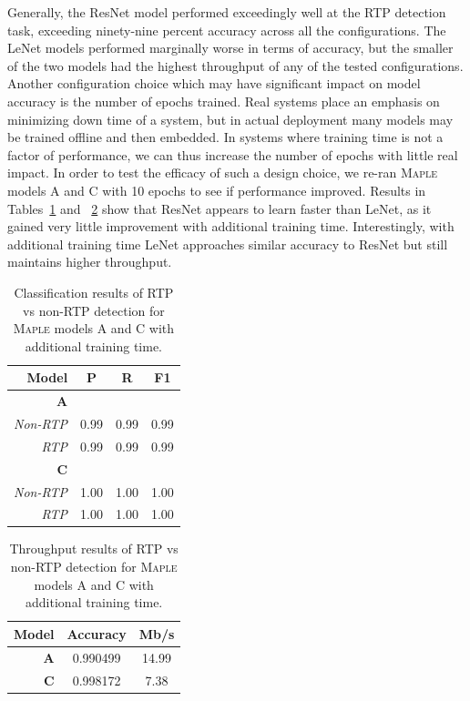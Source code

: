 Generally, the ResNet model performed exceedingly well at the RTP detection task, exceeding ninety-nine percent accuracy across all the configurations. The LeNet models performed marginally worse in terms of accuracy, but the smaller of the two models had the highest throughput of any of the tested configurations. Another configuration choice which may have significant impact on model accuracy is the number of epochs trained. Real systems place an emphasis on minimizing down time of a system, but in actual deployment many models may be trained offline and then embedded. In systems where training time is not a factor of performance, we can thus increase the number of epochs with little real impact. In order to test the efficacy of such a design choice, we re-ran \textsc{Maple} models A and C with 10 epochs to see if performance improved. Results in Tables~\ref{tab:addepoch1} and ~\ref{tab:addepoch2} show that ResNet appears to learn faster than LeNet, as it gained very little improvement with additional training time. Interestingly, with additional training time LeNet approaches similar accuracy to ResNet but still maintains higher throughput.

\begin{table} [h!]
\centering
\small
\begin{tabular}{| r | c | c | c |}
\hline
Model & P & R & F1 \\
\hline
\textbf{A} &&& \\
\textit{Non-RTP} & 0.99 & 0.99 & 0.99 \\
\textit{RTP} & 0.99 & 0.99 & 0.99 \\
\hline
\textbf{C} &&& \\
\textit{Non-RTP} & 1.00 & 1.00 & 1.00 \\
\textit{RTP} & 1.00 & 1.00 & 1.00 \\
\hline
\end{tabular}
\caption{Classification results of RTP vs non-RTP detection for \textsc{Maple} models A and C with additional training time.}
\label{tab:addepoch1}
\end{table}

\begin{table} [h!]
\centering
\small
\begin{tabular}{| r | c | c |}
\hline
Model & Accuracy & Mb/s \\
\hline
\textbf{A} & 0.990499 & 14.99 \\
\hline
\textbf{C} & 0.998172 & 7.38 \\
\hline
\end{tabular}
\caption{Throughput results of RTP vs non-RTP detection for \textsc{Maple} models A and C with additional training time.}
\label{tab:addepoch2}
\end{table}

